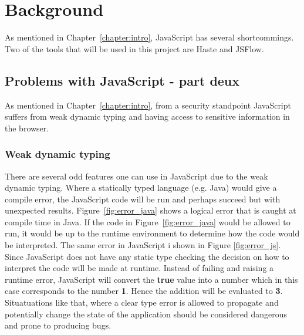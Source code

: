 \section{Background}
As mentioned in Chapter~\ref{chapter:intro}, JavaScript has several shortcommings. Two of the tools that will be used in this project are Haste\cite{haste-lang} and JSFlow\cite{jsflow,jsflow-csf12,jsflow-sac14}.
\subsection{Problems with JavaScript - part deux}
As mentioned in Chapter~\ref{chapter:intro}, from a security standpoint JavaScript suffers from weak dynamic typing and having access to sensitive information in the browser.
\subsubsection{Weak dynamic typing}
There are several odd features one can use in JavaScript due to the weak dynamic typing. Where a statically typed language (e.g. Java) would give a compile error, the JavaScript code will be run and perhaps succeed but with unexpected results. Figure~\ref{fig:error_java} shows a logical error that is caught at compile time in Java. If the code in Figure~\ref{fig:error_java} would be allowed to run, it would be up to the runtime environment to determine how the code would be interpreted. The same error in JavaScript i shown in Figure \ref{fig:error_js}. Since JavaScript does not have any static type checking the decision on how to interpret the code will be made at runtime. Instead of failing and raising a runtime error, JavaScript will convert the \textbf{true} value into a number which in this case corresponds to the number \textbf{1}. Hence the addition will be evaluated to \textbf{3}. Situatuations like that, where a clear type error is allowed to propagate and potentially change the state of the application should be considered dangerous and prone to producing bugs.

